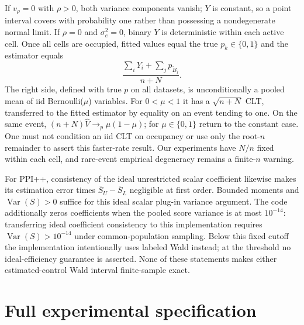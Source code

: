 \documentclass{article}
\newcommand{\Var}{\operatorname{Var}}
\begin{document}
If $v_\rho=0$ with $\rho>0$, both variance components vanish; $Y$ is constant, so a point interval covers with probability one rather than possessing a nondegenerate normal limit. If $\rho=0$ and $\sigma_e^2=0$, binary $Y$ is deterministic within each active cell. Once all cells are occupied, fitted values equal the true $p_k\in\{0,1\}$ and the estimator equals
\begin{equation}\label{eq:degeneratepooled}
 \frac{\sum_iY_i+\sum_jp_{\widetilde B_j}}{n+N}.
\end{equation}
The right side, defined with true $p$ on all datasets, is unconditionally a pooled mean of iid Bernoulli($\mu$) variables. For $0<\mu<1$ it has a $\sqrt{n+N}$ CLT, transferred to the fitted estimator by equality on an event tending to one. On the same event, $(n+N)\widehat V\to_p\mu(1-\mu)$; for $\mu\in\{0,1\}$ return to the constant case. One must not condition an iid CLT on occupancy or use only the root-$n$ remainder to assert this faster-rate result. Our experiments have $N/n$ fixed within each cell, and rare-event empirical degeneracy remains a finite-$n$ warning.

For PPI++, consistency of the ideal unrestricted scalar coefficient likewise makes its estimation error times $\overline S_U-\overline S_L$ negligible at first order. Bounded moments and $\Var(S)>0$ suffice for this ideal scalar plug-in variance argument. The code additionally zeros coefficients when the pooled score variance is at most $10^{-14}$: transferring ideal coefficient consistency to this implementation requires $\Var(S)>10^{-14}$ under common-population sampling. Below this fixed cutoff the implementation intentionally uses labeled Wald instead; at the threshold no ideal-efficiency guarantee is asserted. None of these statements makes either estimated-control Wald interval finite-sample exact.

\section{Full experimental specification}\label{app:protocol}
\end{document}
